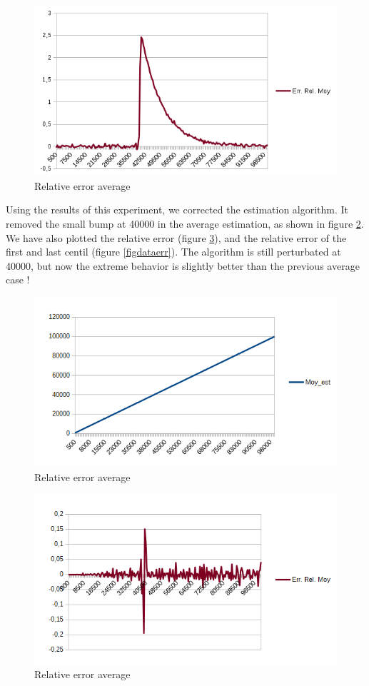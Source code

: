 \documentclass[12pt]{article}
\begin{document}
\begin{figure}[h!]
   \includegraphics[scale=1]{./moy2.png}
   \caption{\label{figerr}Relative error average}
\end{figure}

Using the results of this experiment, we corrected the estimation algorithm. It removed the small bump at 40000 in the average estimation, as shown in figure \ref{figmoycorr}. We have also plotted the relative error (figure \ref{figmoyerr}), and the relative error of the first and last centil (figure \ref{figdataerr}). The algorithm is still perturbated at 40000, but now the extreme behavior is slightly better than the previous average case !

\begin{figure}[h!]
   \includegraphics[scale=1]{./moy_corr.png}
   \caption{\label{figmoycorr}Relative error average}
\end{figure}

\begin{figure}[h!]
   \includegraphics[scale=1]{./moy_err.png}
   \caption{\label{figmoyerr}Relative error average}
\end{figure}
\end{document}
